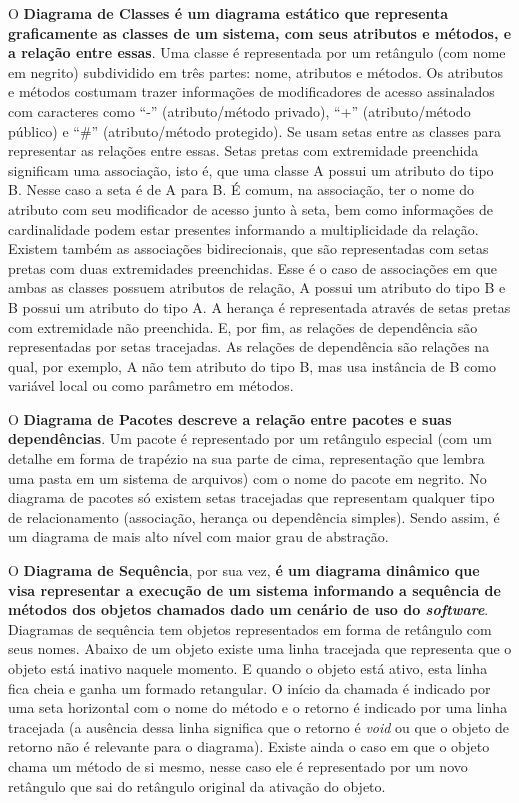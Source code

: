 \documentclass[12pt, a4paper]{article}
\newcommand{\tit}[1]{\textit{#1}}
\newcommand{\tb}[1]{\textbf{#1}}
\newcommand{\sw}{\tit{software}}
\newcommand{\quotes}[1]{``#1''}
\begin{document}
    O \tb{Diagrama de Classes é um diagrama estático que representa graficamente as classes de um sistema, com seus atributos e métodos, e a relação entre essas}. Uma classe é representada por um retângulo (com nome em negrito) subdividido em três partes: nome, atributos e métodos. Os atributos e métodos costumam trazer informações de modificadores de acesso assinalados com caracteres como \quotes{-} (atributo/método privado), \quotes{+}  (atributo/método público) e \quotes{\#} (atributo/método protegido). Se usam setas entre as classes para representar as relações entre essas. Setas pretas com extremidade preenchida significam uma associação, isto é, que uma classe A possui um atributo do tipo B. Nesse caso a seta é de A para B. É comum, na associação, ter o nome do atributo com seu modificador de acesso junto à seta, bem como informações de cardinalidade podem estar presentes informando a multiplicidade da relação. Existem também as associações bidirecionais, que são representadas com setas pretas com duas extremidades preenchidas. Esse é o caso de associações em que ambas as classes possuem atributos de relação, A possui um atributo do tipo B e B possui um atributo do tipo A. A herança é representada através de setas pretas com extremidade não preenchida. E, por fim, as relações de dependência são representadas por setas tracejadas. As relações de dependência são relações na qual, por exemplo, A não tem atributo do tipo B, mas usa instância de B como variável local ou como parâmetro em métodos.
    
    O \tb{Diagrama de Pacotes descreve a relação entre pacotes e suas dependências}. Um pacote é representado por um retângulo especial (com um detalhe em forma de trapézio na sua parte de cima, representação que lembra uma pasta em um sistema de arquivos) com o nome do pacote em negrito. No diagrama de pacotes só existem setas tracejadas que representam qualquer tipo de relacionamento (associação, herança ou dependência simples). Sendo assim, é um diagrama de mais alto nível com maior grau de abstração.
    
    O \tb{Diagrama de Sequência}, por sua vez, \tb{é um diagrama dinâmico que visa representar a execução de um sistema informando a sequência de métodos dos objetos chamados dado um cenário de uso do \sw}. Diagramas de sequência tem objetos representados em forma de retângulo com seus nomes. Abaixo de um objeto existe uma linha tracejada que representa que o objeto está inativo naquele momento. E quando o objeto está ativo, esta linha fica cheia e ganha um formado retangular. O início da chamada é indicado por uma seta horizontal com o nome do método e o retorno é indicado por uma linha tracejada (a ausência dessa linha significa que o retorno é \tit{void} ou que o objeto de retorno não é relevante para o diagrama). Existe ainda o caso em que o objeto chama um método de si mesmo, nesse caso ele é representado por um novo retângulo que sai do retângulo original da ativação do objeto.
    
\end{document}
